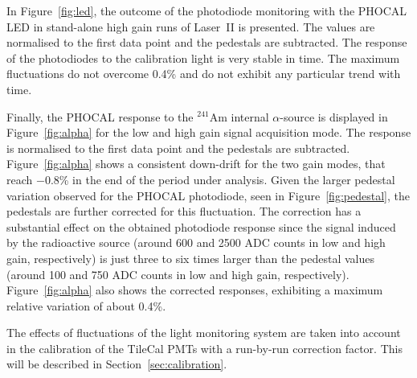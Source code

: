 In Figure~\ref{fig:led}, the outcome of the photodiode monitoring with the PHOCAL LED in stand-alone high gain runs of Laser~II is presented. The values are normalised to the first data point and the pedestals are subtracted. The response of the photodiodes to the calibration light is very stable in time. The maximum fluctuations do not overcome 0.4\% and do not exhibit any particular trend with time.

Finally, the PHOCAL response to the $^{241}$Am internal $\alpha$-source is displayed in Figure~\ref{fig:alpha} for the low and high gain signal acquisition mode. The response is normalised to the first data point and the pedestals are subtracted. Figure~\ref{fig:alpha} shows a consistent down-drift for the two gain modes, that reach $-0.8$\% in the end of the period under analysis. Given the larger pedestal variation observed for the PHOCAL photodiode, seen in Figure~\ref{fig:pedestal}, the pedestals are further corrected for this fluctuation. The correction has a substantial effect on the obtained photodiode response since the signal induced by the radioactive source (around 600 and 2500 ADC counts in low and high gain, respectively) is just three to six times larger than the pedestal values (around 100 and 750 ADC counts in low and high gain, respectively). Figure~\ref{fig:alpha} also shows the corrected responses, exhibiting a maximum relative variation of about 0.4\%.

The effects of fluctuations of the light monitoring system are taken into account in the calibration of the TileCal PMTs with a run-by-run correction factor. This will be described in Section~\ref{sec:calibration}.


